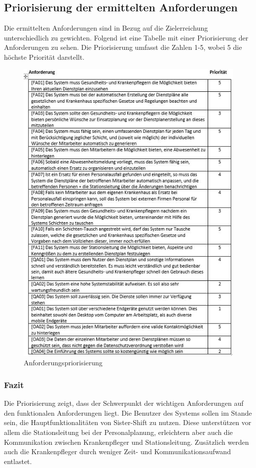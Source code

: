 \documentclass[11pt,
paper=a4,
bibtotocnumbered,	  %
liststotocnumbered,  %
DIV=calc,		  %
tablecaptionabove,	  %
headinclude,
]{article}
\begin{document}
\subsection{Priorisierung der ermittelten Anforderungen}
Die ermittelten Anforderungen sind in Bezug auf die Zielerreichung unterschiedlich zu gewichten. Folgend ist eine Tabelle mit einer Priorisierung der Anforderungen zu sehen. Die Priorisierung umfasst die Zahlen 1-5, wobei 5 die höchste Priorität darstellt.
\begin{figure}[H]
\includegraphics[width=1\textwidth]{Bilder/Tanforderungen.png}
\caption{Anforderungspriorisierung}
\end{figure}
\subsubsection{Fazit}
Die Priorisierung zeigt, dass der Schwerpunkt der wichtigen Anforderungen auf den funktionalen Anforderungen liegt. Die Benutzer des Systems sollen im Stande sein, die Hauptfunktionalitäten von Sister-Shift zu nutzen. Diese unterstützen vor allem die Stationsleitung bei der Personalplanung, erleichtern aber auch die Kommunikation zwischen Krankenpfleger und Stationsleitung. Zusätzlich werden auch die Krankenpfleger durch weniger Zeit- und Kommunikationsaufwand entlastet.
\end{document}
